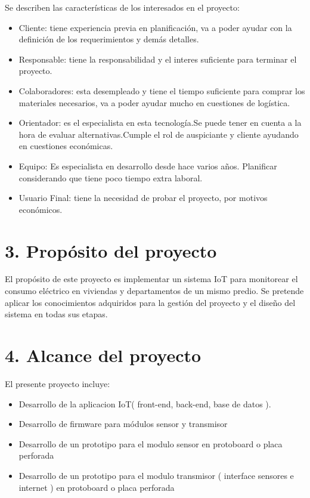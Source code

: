 \documentclass[
11pt, %
]{charter}
\begin{document}
Se describen las características de los interesados en el proyecto:

\begin{itemize}
	\item Cliente: tiene experiencia previa en planificación, va a poder ayudar con la definición de los requerimientos y demás detalles. 
	\item Responsable: tiene la responsabilidad y el interes suficiente para terminar el proyecto.
	\item Colaboradores: esta desempleado y tiene el tiempo suficiente para comprar los materiales necesarios, va a poder ayudar mucho en cuestiones de logística.
	\item Orientador: es el especialista en esta tecnología.Se puede tener en cuenta  a la hora de evaluar alternativas.Cumple el rol de auspiciante y cliente ayudando en cuestiones económicas.
	\item Equipo: Es especialista en desarrollo desde hace varios años. Planificar considerando que tiene poco tiempo extra laboral.
	\item Usuario Final: tiene la necesidad de probar el proyecto, por motivos económicos.
\end{itemize}




\section{3. Propósito del proyecto}
\label{sec:proposito}


El propósito de este proyecto es implementar un sistema IoT para monitorear el consumo eléctrico en viviendas y departamentos de un mismo predio.
Se pretende aplicar los conocimientos adquiridos para la gestión del proyecto y el diseño del sistema en todas sus etapas.


\section{4. Alcance del proyecto}
\label{sec:alcance}


El presente proyecto incluye:

\begin{itemize}
\item{Desarrollo de la aplicacion IoT( front-end, back-end, base de datos ).}
\item{Desarrollo de firmware para módulos sensor y transmisor }
\item{Desarrollo de un prototipo  para el modulo sensor en protoboard o placa perforada}
\item{Desarrollo de un prototipo para el modulo transmisor ( interface sensores e internet ) en protoboard o placa perforada}
\end{itemize}
\end{document}
